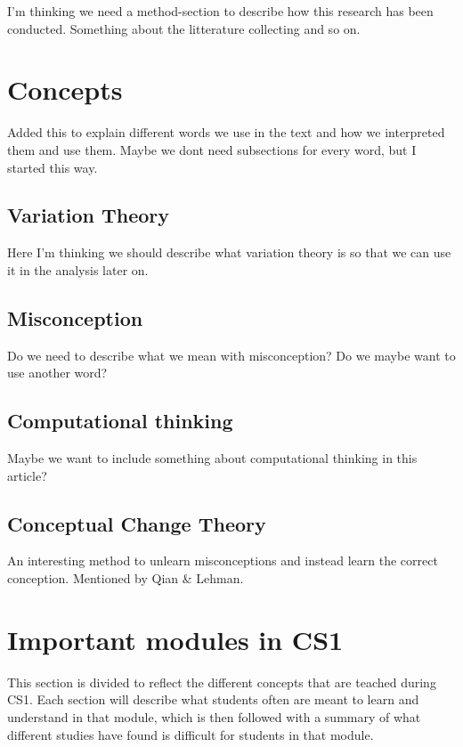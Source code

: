 \documentclass[twocolumn]{article}
\begin{document}
I'm thinking we need a method-section to describe how this research has been conducted. Something about the litterature collecting and so on. 

\section{Concepts}

Added this to explain different words we use in the text and how we interpreted them and use them. Maybe we dont need subsections for every word, but I started this way.

\subsection{Variation Theory}

Here I'm thinking we should describe what variation theory is so that we can use it in the analysis later on.

\subsection{Misconception}

Do we need to describe what we mean with misconception? Do we maybe want to use another word? 

\subsection{Computational thinking}

Maybe we want to include something about computational thinking in this article? 

\subsection{Conceptual Change Theory}

An interesting method to unlearn misconceptions and instead learn the correct conception. Mentioned by Qian \& Lehman. 

\section{Important modules in CS1}

This section is divided to reflect the different concepts that are teached during CS1. Each section will describe what students often are meant to learn and understand in that module, which is then followed with a summary of what different studies have found is difficult for students in that module. 
\end{document}
